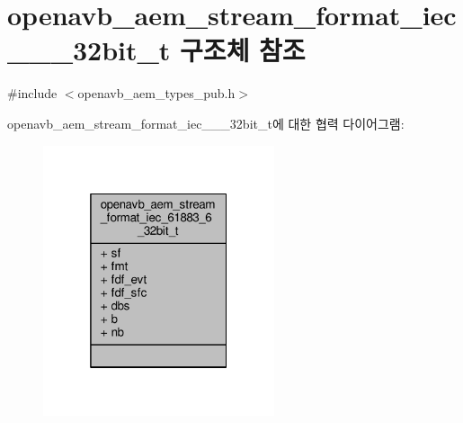 \hypertarget{structopenavb__aem__stream__format__iec__61883__6__32bit__t}{}\section{openavb\+\_\+aem\+\_\+stream\+\_\+format\+\_\+iec\+\_\+\_\+\_\+32bit\+\_\+t 구조체 참조}
\label{structopenavb__aem__stream__format__iec__61883__6__32bit__t}


{\ttfamily \#include $<$openavb\+\_\+aem\+\_\+types\+\_\+pub.\+h$>$}



openavb\+\_\+aem\+\_\+stream\+\_\+format\+\_\+iec\+\_\+\_\+\_\+32bit\+\_\+t에 대한 협력 다이어그램\+:
\nopagebreak
\begin{figure}[H]
\begin{center}
\leavevmode
\includegraphics[width=193pt]{structopenavb__aem__stream__format__iec__61883__6__32bit__t__coll__graph}
\end{center}
\end{figure}
